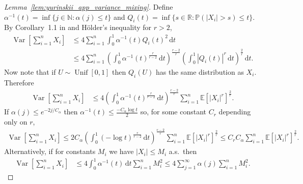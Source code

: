 \documentclass[11pt,lof]{puthesis}
\renewcommand{\P}{\ensuremath{\mathbb{P}}}
\newcommand{\N}{\ensuremath{\mathbb{N}}}
\newcommand{\R}{\ensuremath{\mathbb{R}}}
\newcommand{\E}{\ensuremath{\mathbb{E}}}
\DeclareMathOperator{\Var}{Var}
\DeclareMathOperator{\Unif}{Unif}
\newcommand{\diff}[1]{\,\mathrm{d}#1}
\theoremstyle{break}
\theoremstyle{proof}
\newtheorem{proof}{Proof}
\begin{document}
\begin{proof}[Lemma~\ref{lem:yurinskii_app_variance_mixing}]

Define
$\alpha^{-1}(t) =
\inf\{j \in \N : \alpha(j) \leq t\}$
and $Q_i(t) = \inf\{s \in \R : \P(|X_i| > s) \leq t\}$.
By Corollary~1.1 in \citet{rio2017asymptotic}
and H{\"o}lder's inequality for $r > 2$,
%
\begin{align*}
\Var\left[
\sum_{i=1}^n X_i
\right]
&\leq
4 \sum_{i=1}^n
\int_0^1 \alpha^{-1}(t)
Q_i(t)^2 \diff{t} \\
&\leq
4 \sum_{i=1}^n
\left(
\int_0^1 \alpha^{-1}(t)^{\frac{r}{r-2}} \diff{t}
\right)^{\frac{r-2}{r}}
\left(
\int_0^1 |Q_i(t)|^r \diff{t}
\right)^{\frac{2}{r}}
\diff{t}.
\end{align*}
%
Now note that if $U \sim \Unif[0,1]$ then
$Q_i(U)$ has the same distribution as $X_i$.
Therefore
%
\begin{align*}
\Var\left[
\sum_{i=1}^n X_i
\right]
&\leq
4
\left(
\int_0^1 \alpha^{-1}(t)^{\frac r{r-2}} \diff{t}
\right)^{\frac{r-2}r}
\sum_{i=1}^n
\E[|X_i|^r]^{\frac 2 r}.
\end{align*}
%
If $\alpha(j) \leq e^{-2j/C_\alpha}$ then
$\alpha^{-1}(t) \leq \frac{-C_\alpha \log t}{2}$
so, for some constant
$C_r$ depending only on $r$,
%
\begin{align*}
\Var\left[
\sum_{i=1}^n X_i
\right]
\leq
2 C_\alpha
\left(
\int_0^1 (-\log t)^{\frac r{r-2}} \diff{t}
\right)^{\frac{r-2} r}
\sum_{i=1}^n
\E[|X_i|^r]^{\frac 2 r}
\leq
C_r C_\alpha
\sum_{i=1}^n
\E[|X_i|^r]^{\frac 2 r}.
\end{align*}
%
Alternatively, if for constants $M_i$ we have
$|X_i| \leq M_i$ a.s.\ then
%
\begin{align*}
\Var\left[
\sum_{i=1}^n X_i
\right]
&\leq
4 \int_0^1 \alpha^{-1}(t)
\diff{t}
\sum_{i=1}^n M_i^2
\leq
4 \sum_{j=1}^\infty \alpha(j)
\sum_{i=1}^n M_i^2.
\end{align*}
%
\end{proof}
\end{document}
